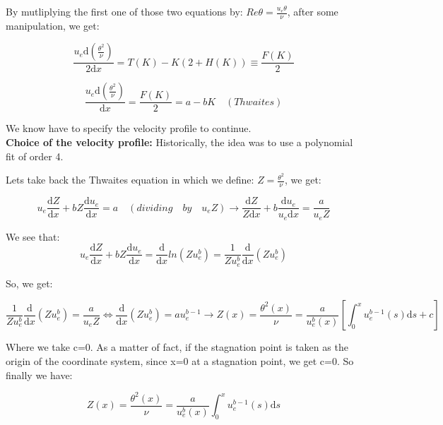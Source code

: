 By mutliplying the first one of those two equations by: $R{e \theta}=\frac{u_e \theta}{\nu}$, after some manipulation, we get:

\begin{equation}
\newcommand{\deriv}{\mathrm{d}}
\frac{u_e \deriv (\frac{\theta^2}{\nu})}{2 \deriv x}=T(K)-K (2+H(K)) \equiv\frac{F(K)}{2}
\end{equation}

\begin{equation}
\newcommand{\deriv}{\mathrm{d}}
\frac{u_e \deriv (\frac{\theta^2}{\nu})}{\deriv x}=\frac{F(K)}{2}=a-bK \quad (Thwaites)
\end{equation}

We know have to specify the velocity profile to continue.
\\

\textbf{Choice of the velocity profile:} Historically, the idea was to use a polynomial fit of order 4.

Lets take back the Thwaites equation in which we define: $Z=\frac{\theta^2}{\nu}$, we get:

\begin{equation}
\newcommand{\deriv}{\mathrm{d}}
u_e\frac{\deriv Z}{\deriv x}+ bZ\frac{\deriv u_e}{\deriv x}=a \quad (dividing \quad by\quad u_eZ)\rightarrow \frac{\deriv Z}{Z \deriv x}+b \frac{\deriv u_e}{u_e \deriv x}=\frac{a}{u_eZ} 
\end{equation}

We see that:
\begin{equation}
\newcommand{\deriv}{\mathrm{d}}
u_e\frac{\deriv Z}{\deriv x}+ bZ\frac{\deriv u_e}{\deriv x}=\frac{\deriv }{\deriv x} ln(Zu_e^b)=\frac{1}{Zu_e^b}\frac{\deriv }{\deriv x} (Zu_e^b)
\end{equation}

So, we get:

\begin{equation}
\newcommand{\deriv}{\mathrm{d}}
\frac{1}{Zu_e^b}\frac{\deriv }{\deriv x} (Zu_e^b)=\frac{a}{u_eZ} \Leftrightarrow \frac{\deriv }{\deriv x} (Zu_e^b)=au_e^{b-1} \rightarrow Z(x)=\frac{\theta^2(x)}{\nu}=\frac{a}{u_e^b(x)}[\int_0^x u_e^{b-1}(s) \deriv s +c]
\end{equation}

Where we take c=0. As a matter of fact, if the stagnation point is taken as the origin of the coordinate system, since x=0 at a stagnation point, we get c=0. So finally we have:

\begin{equation}
\newcommand{\deriv}{\mathrm{d}}
 Z(x)=\frac{\theta^2(x)}{\nu}=\frac{a}{u_e^b(x)}\int_0^x u_e^{b-1}(s) \deriv s
\end{equation}


